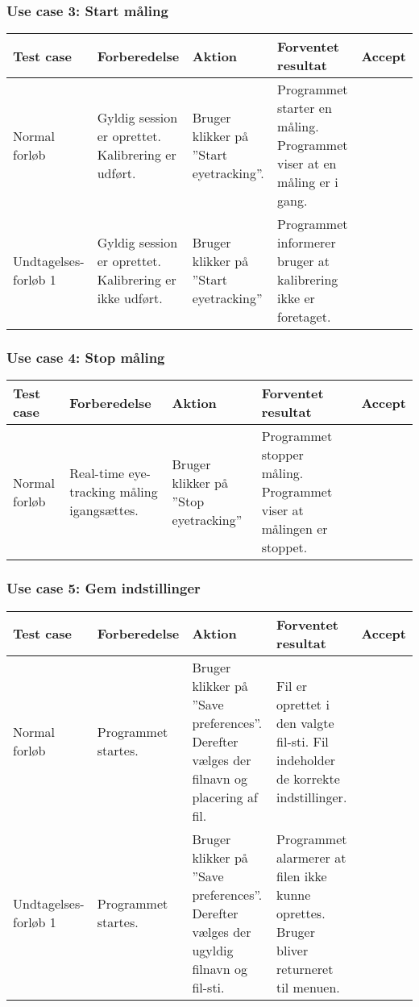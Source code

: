 \documentclass[accepttest.tex]{subfiles}
\begin{document}
\subsubsection{Use case 3: Start måling}
\begin{table}[H]
	\small
	\begin{tabular}{|p{2cm}|p{3cm}|p{3cm}|p{3cm}|l|}
		\hline Test case & Forberedelse & Aktion & Forventet resultat & Accept \\ 
		\hline Normal forløb & Gyldig session er oprettet. Kalibrering er udført.  & Bruger klikker på ”Start eyetracking”.   & Programmet starter en måling. Programmet viser at en måling er i gang. & {\Huge\checkmark}\\
		
		\hline Undtagelses-forløb 1 & Gyldig session er oprettet. Kalibrering er ikke udført. & Bruger klikker på ”Start eyetracking” & Programmet informerer bruger at kalibrering ikke er foretaget.  & {\Huge\checkmark}\\
		\hline 
	\end{tabular}
\end{table}

\subsubsection{Use case 4: Stop måling}
\begin{table}[H]
	\small
	\begin{tabular}{|p{2cm}|p{3cm}|p{3cm}|p{3cm}|l|}
		\hline Test case & Forberedelse & Aktion & Forventet resultat & Accept \\ 
		\hline Normal forløb & Real-time eye-tracking måling igangsættes. & Bruger klikker på ”Stop eyetracking” & Programmet stopper måling. Programmet viser at målingen er stoppet.  & {\Huge\checkmark}\\
		\hline 
	\end{tabular}
\end{table}

\subsubsection{Use case 5: Gem indstillinger}
\begin{table}[H]
	\small
	\begin{tabular}{|p{2cm}|p{3cm}|p{3cm}|p{3cm}|l|}
		\hline Test case & Forberedelse & Aktion & Forventet resultat & Accept \\ 
		\hline Normal forløb & Programmet startes. & Bruger klikker på ”Save preferences”. Derefter vælges der filnavn og placering af fil. & Fil er oprettet i den valgte fil-sti. Fil indeholder de korrekte indstillinger. & \\
		
		\hline Undtagelses-forløb 1 & Programmet startes. & Bruger klikker på ”Save preferences”. Derefter vælges der ugyldig filnavn og fil-sti. & Programmet alarmerer at filen ikke kunne oprettes. Bruger bliver returneret til menuen. &\\
		\hline 
	\end{tabular}
\end{table}
\end{document}
